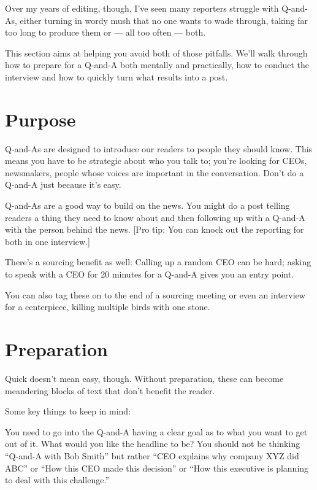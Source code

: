 \documentclass[
  11pt,
  american,
  letterpaperpaper,
  extrafontsizes,onecolumn,openright
  ]{memoir}
\begin{document}
Over my years of editing, though, I've seen many reporters struggle with Q-and-As, either turning in wordy mush that no one wants to wade through, taking far too long to produce them or --- all too often --- both.

This section aims at helping you avoid both of those pitfalls. We'll walk through how to prepare for a Q-and-A both mentally and practically, how to conduct the interview and how to quickly turn what results into a post.

\hypertarget{purpose}{%
\section*{Purpose}\label{purpose}}

Q-and-As are designed to introduce our readers to people they should know. This means you have to be strategic about who you talk to; you're looking for CEOs, newsmakers, people whose voices are important in the conversation. Don't do a Q-and-A just because it's easy.

Q-and-As are a good way to build on the news. You might do a post telling readers a thing they need to know about and then following up with a Q-and-A with the person behind the news. {[}Pro tip: You can knock out the reporting for both in one interview.{]}

There's a sourcing benefit as well: Calling up a random CEO can be hard; asking to speak with a CEO for 20 minutes for a Q-and-A gives you an entry point.

You can also tag these on to the end of a sourcing meeting or even an interview for a centerpiece, killing multiple birds with one stone.

\hypertarget{preparation}{%
\section*{Preparation}\label{preparation}}

Quick doesn't mean easy, though. Without preparation, these can become meandering blocks of text that don't benefit the reader.

Some key things to keep in mind:

You need to go into the Q-and-A having a clear goal as to what you want to get out of it. What would you like the headline to be? You should not be thinking \enquote{Q-and-A with Bob Smith} but rather \enquote{CEO explains why company XYZ did ABC} or \enquote{How this CEO made this decision} or \enquote{How this executive is planning to deal with this challenge.}
\end{document}
